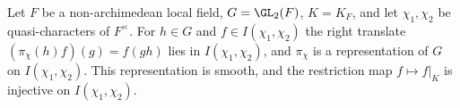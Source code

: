 Let $F$ be a non-archimedean local field, $G=\GL_2(F)$, $K=K_F$, and let $\chi_1,\chi_2$ be quasi-characters of
$F^\times$. For $h\in G$ and $f\in I(\chi_1,\chi_2)$ the right translate $(\pi_\chi(h)f)(g)=f(gh)$ lies in
$I(\chi_1,\chi_2)$, and $\pi_\chi$ is a representation of $G$ on $I(\chi_1,\chi_2)$. This representation is smooth, and
the restriction map $f\mapsto f|_K$ is injective on $I(\chi_1,\chi_2)$.
